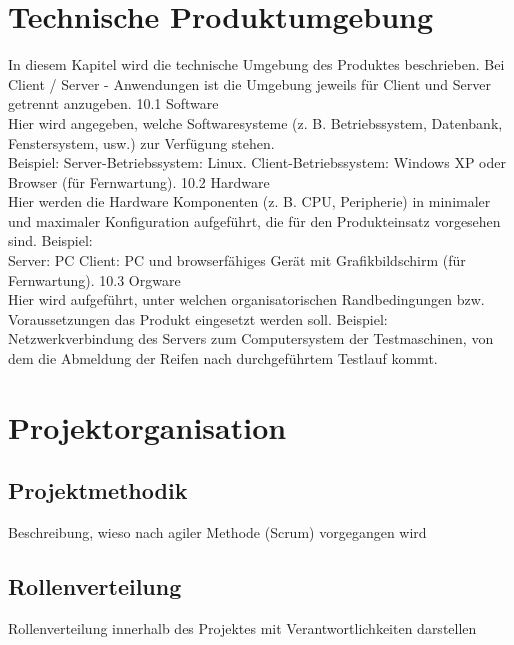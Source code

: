 \documentclass[%
	ngerman,
	12pt,
	a4paper,
	oneside,
	parskip=full
]{scrbook}
\begin{document}
\chapter{Technische Produktumgebung}
In diesem Kapitel wird die technische Umgebung des Produktes beschrieben. Bei Client /
Server - Anwendungen ist die Umgebung jeweils für Client und Server getrennt anzugeben.
10.1 Software\\
Hier wird angegeben, welche Softwaresysteme (z. B. Betriebssystem, Datenbank,
Fenstersystem, usw.) zur Verfügung stehen.\\
Beispiel:
Server-Betriebssystem: Linux.
Client-Betriebssystem: Windows XP oder Browser (für Fernwartung).
10.2 Hardware \\
Hier werden die Hardware Komponenten (z. B. CPU, Peripherie) in minimaler und maximaler
Konfiguration aufgeführt, die für den Produkteinsatz vorgesehen sind.
Beispiel:\\
Server: PC
Client: PC und browserfähiges Gerät mit Grafikbildschirm (für Fernwartung).
10.3 Orgware\\
Hier wird aufgeführt, unter welchen organisatorischen Randbedingungen bzw.
Voraussetzungen das Produkt eingesetzt werden soll.
Beispiel:\\
Netzwerkverbindung des Servers zum Computersystem der Testmaschinen, von dem die
Abmeldung der Reifen nach durchgeführtem Testlauf kommt.

\chapter{Projektorganisation}
\section{Projektmethodik}
Beschreibung, wieso nach agiler Methode (Scrum) vorgegangen wird
\section{Rollenverteilung}
Rollenverteilung innerhalb des Projektes mit Verantwortlichkeiten darstellen
\end{document}
